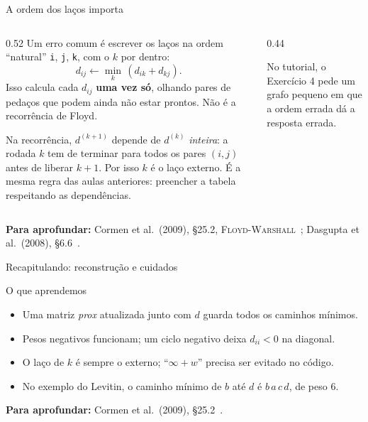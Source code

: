 \documentclass[aspectratio=169,xcolor=table]{beamer}
\newcommand{\fonte}[1]{%
  \vfill
  {\tiny\color{gray!55!black}\textbf{Para aprofundar:} #1\par}%
}
\begin{document}
\begin{frame}{A ordem dos laços importa}
  \begin{columns}[c]
    \begin{column}{0.52\textwidth}
      \scriptsize Um erro comum é escrever os laços na ordem ``natural'' \texttt{i}, \texttt{j},
      \texttt{k}, com o $k$ por dentro:
      \[ d_{ij} \leftarrow \min_k\,(d_{ik} + d_{kj}). \]
      Isso calcula cada $d_{ij}$ \textbf{uma vez só}, olhando pares de pedaços que podem ainda
      não estar prontos. Não é a recorrência de Floyd.
      \medskip

      Na recorrência, $d^{(k+1)}$ depende de $d^{(k)}$ \emph{inteira}: a rodada $k$ tem de
      terminar para todos os pares $(i,j)$ antes de liberar $k+1$. Por isso $k$ é o laço
      externo. É a mesma regra das aulas anteriores: preencher a tabela respeitando as
      dependências.
    \end{column}
    \begin{column}{0.44\textwidth}
      \centering
      \medskip

      {\tiny No tutorial, o Exercício 4 pede um grafo pequeno em que a ordem errada dá a
      resposta errada.\par}
    \end{column}
  \end{columns}
  \fonte{Cormen et al.\ (2009), \S 25.2, \textsc{Floyd-Warshall}~\cite{cormen2009introduction};
    Dasgupta et al.\ (2008), \S 6.6~\cite{dasgupta2008algorithms}.}
\end{frame}

\begin{frame}{Recapitulando: reconstrução e cuidados}
  \begin{block}{O que aprendemos}
    \begin{itemize}\scriptsize
      \item Uma matriz \textit{prox} atualizada junto com $d$ guarda todos os caminhos mínimos.
      \item Pesos negativos funcionam; um ciclo negativo deixa $d_{ii} < 0$ na diagonal.
      \item O laço de $k$ é sempre o externo; ``$\infty + w$'' precisa ser evitado no código.
      \item No exemplo do Levitin, o caminho mínimo de $b$ até $d$ é $b\,a\,c\,d$, de peso $6$.
    \end{itemize}
  \end{block}
  \fonte{Cormen et al.\ (2009), \S 25.2~\cite{cormen2009introduction}.}
\end{frame}
\end{document}
